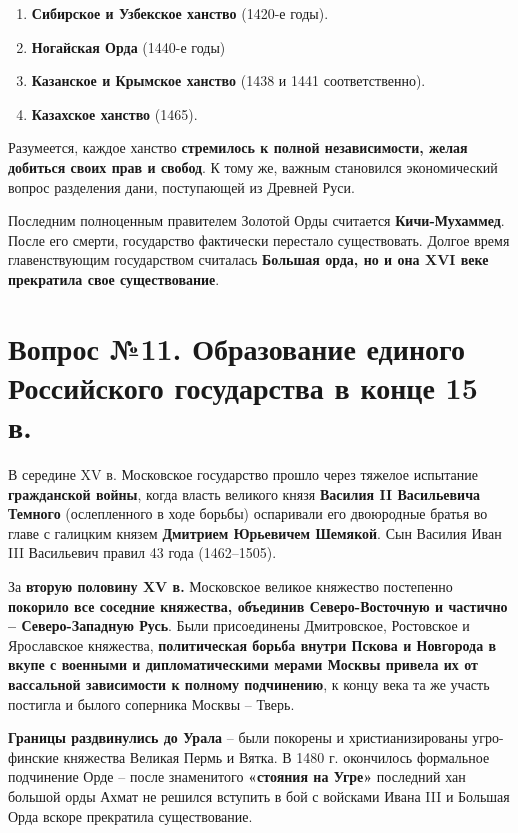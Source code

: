 \documentclass{article}
\begin{document}
\begin{enumerate}
    \item \textbf{Сибирское и Узбекское ханство} (1420-е годы).
    \item \textbf{Ногайская Орда} (1440-е годы)
    \item \textbf{Казанское и Крымское ханство} (1438 и 1441 соответственно).
    \item \textbf{Казахское ханство} (1465).
\end{enumerate}

Разумеется, каждое ханство \textbf{стремилось к полной независимости, желая добиться своих прав и свобод}. К тому же, важным становился экономический вопрос разделения дани, поступающей из Древней Руси.

Последним полноценным правителем Золотой Орды считается \textbf{Кичи-Мухаммед}. После его смерти, государство фактически перестало существовать. Долгое время главенствующим государством считалась \textbf{Большая орда, но и она XVI веке прекратила свое существование}.

\pagebreak
\section{Вопрос №11. Образование единого Российского государства в конце 15 в.}

В середине XV в. Московское государство прошло через тяжелое испытание \textbf{гражданской войны}, когда власть великого князя \textbf{Василия II Васильевича Темного} (ослепленного в ходе борьбы) оспаривали его двоюродные братья во главе с галицким князем \textbf{Дмитрием Юрьевичем Шемякой}. Сын Василия Иван III Васильевич правил 43 года (1462–1505).

За \textbf{вторую половину XV в.} Московское великое княжество постепенно \textbf{покорило все соседние княжества, объединив Северо-Восточную и частично – Северо-Западную Русь}. Были присоединены Дмитровское, Ростовское и Ярославское княжества, \textbf{политическая борьба внутри Пскова и Новгорода в вкупе с военными и дипломатическими мерами Москвы привела их от вассальной зависимости к полному подчинению}, к концу века та же участь постигла и былого соперника Москвы – Тверь.

\textbf{Границы раздвинулись до Урала} – были покорены и христианизированы угро-финские княжества Великая Пермь и Вятка. В 1480 г. окончилось формальное подчинение Орде – после знаменитого \textbf{«стояния на Угре»} последний хан большой орды Ахмат не решился вступить в бой с войсками Ивана III и Большая Орда вскоре прекратила существование.
\end{document}
